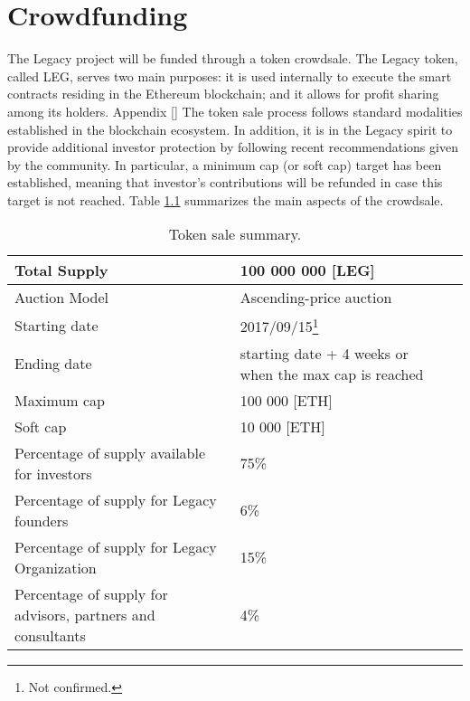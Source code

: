 \chapter{Crowdfunding} %
\label{cha:crowdfunding}

The Legacy project will be funded through a token crowdsale. The Legacy token, called LEG, serves two main purposes: it is used internally to execute the smart contracts residing in the Ethereum blockchain; and it allows for profit sharing among its holders.  Appendix \ref{} The token sale process follows standard modalities established in the blockchain ecosystem. In addition, it is in the Legacy spirit to provide additional investor protection by following recent recommendations given by the community. In particular, a minimum cap (or soft cap) target has been established, meaning that investor’s contributions will be refunded in case this target is not reached. Table \ref{table:ico_summary} summarizes the main aspects of the crowdsale.

\begin{table}[h]
	\begin{center}
			\small
			\begin{tabular}{| l | p{5cm} | p{3cm}  |}	
		    \hline	
		    	Total Supply		&  100 000 000 [LEG]  \\ \hline
		    	Auction Model       &  Ascending-price auction \\ \hline
				Starting date       &  2017/09/15\footnote{Not confirmed.} \\ \hline
				Ending date         &  starting date + 4 weeks or when the max cap is reached \\ \hline
				Maximum cap         &  100 000 [ETH] \\ \hline
				Soft cap            &  10 000 [ETH] \\ \hline
				Percentage of supply available for investors & 75\% \\ \hline
				Percentage of supply for Legacy founders     &  6\% \\ \hline
				Percentage of supply for Legacy Organization & 15\% \\ \hline
				Percentage of supply for advisors, partners and consultants & 4\% \\
			\hline	
			\end{tabular}				
	\caption{Token sale summary.}
	\label{table:ico_summary}		
	\end{center}
\end{table}


